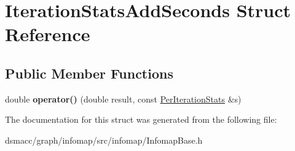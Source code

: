 \hypertarget{structIterationStatsAddSeconds}{}\section{Iteration\+Stats\+Add\+Seconds Struct Reference}
\label{structIterationStatsAddSeconds}
\subsection*{Public Member Functions}
\begin{DoxyCompactItemize}
\item 
\mbox{\label{structIterationStatsAddSeconds_a177c42dd1353d8505276404bd9d08df2}} 
double {\bfseries operator()} (double result, const \mbox{\hyperlink{structPerIterationStats}{Per\+Iteration\+Stats}} \&s)
\end{DoxyCompactItemize}


The documentation for this struct was generated from the following file\+:\begin{DoxyCompactItemize}
\item 
dsmacc/graph/infomap/src/infomap/Infomap\+Base.\+h\end{DoxyCompactItemize}
